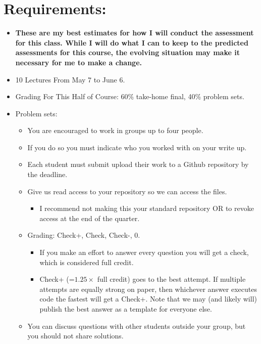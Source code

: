 \documentclass[12pt]{article}
\begin{document}
\section*{Requirements:}

\begin{itemize}
	\item {\bf These are my best estimates for how I will conduct the assessment for this class. While I will do what I can to keep to the predicted assessments for this course, the evolving situation may make it necessary for me to make a change.}
	\item 10 Lectures From May 7 to June 6.
	\item Grading For This Half of Course: 60\% take-home final, 40\% problem sets.
	\item Problem sets:
	\begin{itemize}
		\item You are encouraged to work in groups up to four people.
		\item  If you do so you must indicate who you worked with on your write up.
		\item  Each student must submit upload their work to a Github repository by the deadline.
		\item Give us read access to your repository so we can access the files.
		\begin{itemize}
			\item I recommend not making this your standard repository OR to revoke access at the end of the quarter.
		\end{itemize}
		\item Grading: Check+, Check, Check-, 0.
		\begin{itemize}
			\item If you make an effort to answer every question you will get a check, which is considered full credit.
			\item Check+ (=$1.25\times$ full credit) goes to the best attempt. If multiple attempts are equally strong on paper, then whichever answer executes code the fastest will get a Check+. Note that we may (and likely will) publish the best answer as a template for everyone else.
		\end{itemize}
		\item You can discuss questions with other students outside your group, but you should not share solutions.

\end{itemize}
\end{itemize}
\end{document}
